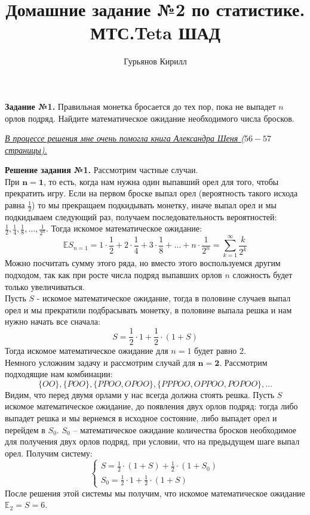 \documentclass[a4paper, 12pt]{article}
\author{Гурьянов Кирилл}
\title{Домашние задание №2 по статистике. МТС.Teta ШАД}
\date{\todaS}
\begin{document}
\textbf{Задание №1.} Правильная монетка бросается до тех пор, пока не выпадет $n$ орлов подряд. Найдите математическое ожидание необходимого числа бросков.

\vspace{0.5cm} 

\href{http://old.mccme.ru/free-books/shen/shen-probabilitS.pdf}{\textit{В процессе решения мне очень помогла книга Александра Шеня ($56 - 57$ страницы).}}

\vspace{0.5cm}

\textbf{Решение задания №1.} Рассмотрим частные случаи. \\  

При $\mathbf{n = 1}$, то есть, когда нам нужна один выпавший орел для того, чтобы прекратить игру. Если на первом броске выпал орел (вероятность такого исхода равна {$\frac{1}{2}$) то мы прекращаем подкидывать монетку, иначе выпал орел и мы подкидываем следующий раз, получаем последовательность вероятностей: $\frac{1}{2}, \frac{1}{4}, \frac{1}{8}, \dots, \frac{1}{2^n}$. Тогда искомое математическое ожидание:
\[
    \mathbb{E}{S_{n=1}} = 1 \cdot \frac{1}{2} + 2 \cdot \frac{1}{4} + 3 \cdot \frac{1}{8} + \dots + n \cdot \frac{1}{2^n} = \sum_{k=1}^{\infty} \frac{k}{2^k} 
\]
Можно посчитать сумму этого ряда, но вместо этого воспользуемся другим подходом, так как при росте числа подряд выпавших орлов $n$ сложность будет только увеличиваться. \\ 

Пусть $S$ - искомое математическое ожидание, тогда в половине случаев выпал орел и мы прекратили подбрасывать монетку, в половине выпала решка и нам нужно начать все сначала:
\[
    S = \frac{1}{2} \cdot 1 + \frac{1}{2} \cdot (1 + S)
\]
Тогда искомое математическое ожидание для $n = 1$ будет равно $2$. \\ 

Немного усложним задачу и рассмотрим случай для $\mathbf{n = 2}$. Рассмотрим подходящие нам комбинации: 
\[
    \{ OO \}, \{ POO \}, \{ PPOO, OPOO \}, \{ PPPOO, OPPOO, POPOO \}, \dots
\]
Видим, что перед двумя орлами у нас всегда должна стоять решка. Пусть $S$ искомое математическое ожидание, до появления двух орлов подряд: тогда либо выпадет решка и мы вернемся в исходное состояние, либо выпадет орел и перейдем в $S_0$. $S_0$ -- математическое ожидание количества бросков необходимое для получения двух орлов подряд, при условии, что на предыдущем шаге выпал орел. Получим систему:
\[
    \begin{cases}
        S = \frac{1}{2} \cdot (1 + S) + \frac{1}{2} \cdot (1 + S_0) \\ 
        S_0 = \frac{1}{2} \cdot 1 + \frac{1}{2} \cdot (1 + S)
    \end{cases}
\]
После решения этой системы мы получим, что искомое математическое ожидание $\mathbb{E}_2 = S = 6$. \\

}
\end{document}
